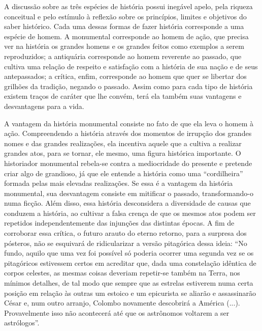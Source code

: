 A discussão sobre as três espécies de história possui inegável apelo,
pela riqueza conceitual e pelo estímulo à reflexão sobre os princípios,
limites e objetivos do saber histórico. Cada uma dessas formas de fazer
história corresponde a uma espécie de homem. A monumental corresponde ao
homem de ação, que precisa ver na história os grandes homens e os
grandes feitos como exemplos a serem reproduzidos; a antiquária
corresponde ao homem reverente ao passado, que cultiva uma relação de
respeito e satisfação com a história de sua nação e de seus
antepassados; a crítica, enfim, corresponde ao homem que quer se
libertar dos grilhões da tradição, negando o passado. Assim como para
cada tipo de história existem traços de caráter que lhe convém, terá ela
também suas vantagens e desvantagens para a vida.

A vantagem da história monumental consiste no fato de que ela leva o
homem à ação. Compreendendo a história através dos momentos de irrupção
dos grandes nomes e das grandes realizações, ela incentiva aquele que a
cultiva a realizar grandes atos, para se tornar, ele mesmo, uma figura
histórica importante. O historiador monumental rebela-se contra a
mediocridade do presente e pretende criar algo de grandioso, já que ele
entende a história como uma ``cordilheira'' formada pelas mais elevadas
realizações. Se essa é a vantagem da história monumental, sua
desvantagem consiste em mitificar o passado, transformando-o numa
ficção. Além disso, essa história desconsidera a diversidade de causas
que conduzem a história, ao cultivar a falsa crença de que os mesmos
atos podem ser repetidos independentemente das injunções das distintas
épocas. A fim de corroborar essa crítica, o futuro arauto do eterno
retorno, para a surpresa dos pósteros, não se esquivará de ridicularizar
a versão pitagórica dessa ideia: ``No fundo, aquilo que uma vez foi
possível só poderia ocorrer uma segunda vez se os pitagóricos estivessem
certos em acreditar que, dada uma constelação idêntica de corpos
celestes, as mesmas coisas deveriam repetir-se também na Terra, nos
mínimos detalhes, de tal modo que sempre que as estrelas estiverem numa
certa posição em relação às outras um estoico e um epicurista se aliarão
e assassinarão César e, num outro arranjo, Colombo novamente descobrirá
a América (...). Provavelmente isso não acontecerá até que os astrônomos
voltarem a ser astrólogos''.

